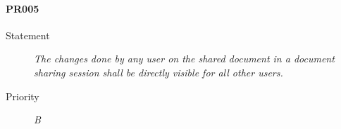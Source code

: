\paragraph{PR005}
  \begin{description}
  \item [Statement] 
    \textit{ The changes done by any user on the shared document in a document sharing session shall be directly visible for all other users.}
  \item [Priority] \textit{B}
\end{description}
